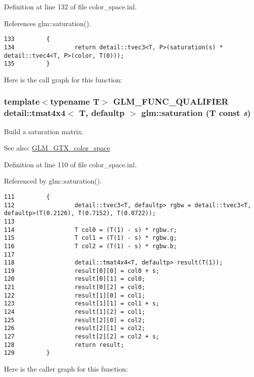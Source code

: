 Definition at line 132 of file color\_\-space.inl.

References glm::saturation().

\begin{Code}\begin{verbatim}133         {
134                 return detail::tvec3<T, P>(saturation(s) * detail::tvec4<T, P>(color, T(0)));
135         }
\end{verbatim}
\end{Code}




Here is the call graph for this function:\hypertarget{group__gtx__color__space_g53a08c053e194bad0bfc172ef950bfe7}{
\subsubsection[saturation]{\setlength{\rightskip}{0pt plus 5cm}template$<$typename T$>$ GLM\_\-FUNC\_\-QUALIFIER detail::tmat4x4$<$ T, defaultp $>$ glm::saturation (T const  {\em s})}}
\label{group__gtx__color__space_g53a08c053e194bad0bfc172ef950bfe7}


Build a saturation matrix. \begin{Desc}
\item[See also:]\hyperlink{group__gtx__color__space}{GLM\_\-GTX\_\-color\_\-space} \end{Desc}


Definition at line 110 of file color\_\-space.inl.

Referenced by glm::saturation().

\begin{Code}\begin{verbatim}111         {
112                 detail::tvec3<T, defaultp> rgbw = detail::tvec3<T, defaultp>(T(0.2126), T(0.7152), T(0.0722));
113 
114                 T col0 = (T(1) - s) * rgbw.r;
115                 T col1 = (T(1) - s) * rgbw.g;
116                 T col2 = (T(1) - s) * rgbw.b;
117 
118                 detail::tmat4x4<T, defaultp> result(T(1));
119                 result[0][0] = col0 + s;
120                 result[0][1] = col0;
121                 result[0][2] = col0;
122                 result[1][0] = col1;
123                 result[1][1] = col1 + s;
124                 result[1][2] = col1;
125                 result[2][0] = col2;
126                 result[2][1] = col2;
127                 result[2][2] = col2 + s;
128                 return result;
129         }
\end{verbatim}
\end{Code}




Here is the caller graph for this function: